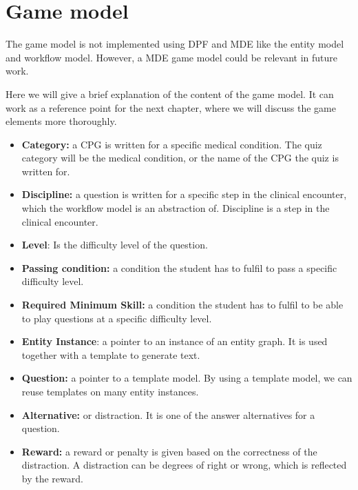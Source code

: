 \section{Game model}
The game model is not implemented using DPF and MDE like the entity model and workflow model. However, a MDE game model could be relevant in future work.

Here we will give a brief explanation of the content of the game model. It can work as a reference point for the next chapter, where we will discuss the game elements more thoroughly.
\begin{itemize}
	\item \textbf{Category:} a CPG is written for a specific medical condition. The quiz category will be the medical condition, or the name of the CPG the quiz is written for.
	\item \textbf{Discipline:} a question is written for a specific step in the clinical encounter, which the workflow model is an abstraction of. Discipline is a step in the clinical encounter.
	\item \textbf{Level}: Is the difficulty level of the question.
	\item \textbf{Passing condition:} a condition the student has to fulfil to pass a specific  difficulty level.
	\item \textbf{Required Minimum Skill:} a condition the student has to fulfil to be able to play questions at a specific difficulty level.
	\item\textbf{Entity Instance}: a pointer to an instance of an entity graph. It is used together with a template to generate text.
	\item \textbf{Question:} a pointer to a template model. By using a template model, we can reuse templates on many entity instances.
	\item \textbf{Alternative:} or distraction. It is one of the answer alternatives for a question. 
	\item \textbf{Reward:} a reward or penalty is given based on the correctness of the distraction. A distraction can be degrees of right or wrong, which is reflected by the reward.	
\end{itemize} 

